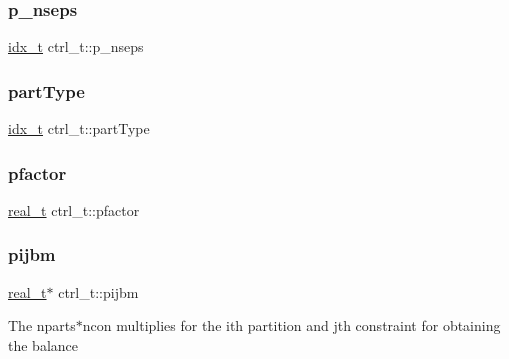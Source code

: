 \subsubsection{\texorpdfstring{p\+\_\+nseps}{p\_nseps}}
{\footnotesize\ttfamily \hyperlink{3rd_party_2parmetis-4_80_83_2metis_2include_2metis_8h_aaa5262be3e700770163401acb0150f52}{idx\+\_\+t} ctrl\+\_\+t\+::p\+\_\+nseps}

\mbox{\label{structctrl__t_afadeadc5b9dbc27c580f0bddcdb15b9a}} 
\subsubsection{\texorpdfstring{part\+Type}{partType}}
{\footnotesize\ttfamily \hyperlink{3rd_party_2parmetis-4_80_83_2metis_2include_2metis_8h_aaa5262be3e700770163401acb0150f52}{idx\+\_\+t} ctrl\+\_\+t\+::part\+Type}

\mbox{\label{structctrl__t_a3322c07da4ca861a3fe47dc934510e24}} 
\subsubsection{\texorpdfstring{pfactor}{pfactor}}
{\footnotesize\ttfamily \hyperlink{3rd_party_2parmetis-4_80_83_2metis_2include_2metis_8h_a1924a4f6907cc3833213aba1f07fcbe9}{real\+\_\+t} ctrl\+\_\+t\+::pfactor}

\mbox{\label{structctrl__t_ae347c6497954a20166af15a2ddd4e286}} 
\subsubsection{\texorpdfstring{pijbm}{pijbm}}
{\footnotesize\ttfamily \hyperlink{3rd_party_2parmetis-4_80_83_2metis_2include_2metis_8h_a1924a4f6907cc3833213aba1f07fcbe9}{real\+\_\+t}$\ast$ ctrl\+\_\+t\+::pijbm}

The nparts$\ast$ncon multiplies for the ith partition and jth constraint for obtaining the balance \mbox{\label{structctrl__t_a5261c7a1d0f02a8d39885ed88c34cfe6}} 
